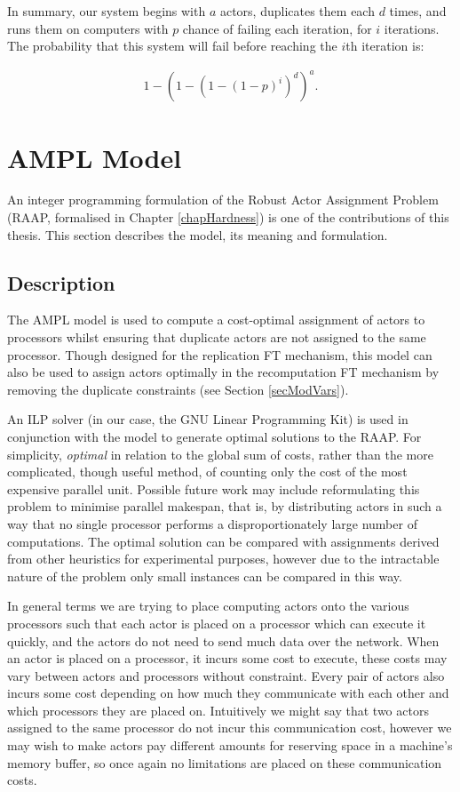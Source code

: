 In summary, our system begins with $a$ actors, duplicates them each $d$ times, and runs them on computers with $p$ chance of failing each iteration, for $i$ iterations.
The probability that this system will fail before reaching the $i$th iteration is:

\begin{align}
	\nonumber 1-(1-(1-(1-p)^i)^d)^a.
\end{align}

\section{AMPL Model}

An integer programming formulation of the Robust Actor Assignment Problem (RAAP, formalised in Chapter \ref{chapHardness}) is one of the contributions of this thesis.
This section describes the model, its meaning and formulation.

\subsection{Description}

The AMPL model is used to compute a cost-optimal assignment of actors to processors whilst ensuring that duplicate actors are not assigned to the same processor.
Though designed for the replication FT mechanism, this model can also be used to assign actors optimally in the recomputation FT mechanism by removing the duplicate constraints (see Section \ref{secModVars}).

An ILP solver (in our case, the GNU Linear Programming Kit) is used in conjunction with the model to generate optimal solutions to the RAAP.
For simplicity, {\em optimal} in relation to the global sum of costs, rather than the more complicated, though useful method, of counting only the cost of the most expensive parallel unit.
Possible future work may include reformulating this problem to minimise parallel makespan, that is, by distributing actors in such a way that no single processor performs a disproportionately large number of computations.
The optimal solution can be compared with assignments derived from other heuristics for experimental purposes, however due to the intractable nature of the problem only small instances can be compared in this way.

In general terms we are trying to place computing actors onto the various processors such that each actor is placed on a processor which can execute it quickly, and the actors do not need to send much data over the network.
When an actor is placed on a processor, it incurs some cost to execute, these costs may vary between actors and processors without constraint.
Every pair of actors also incurs some cost depending on how much they communicate with each other and which processors they are placed on.
Intuitively we might say that two actors assigned to the same processor do not incur this communication cost, however we may wish to make actors pay different amounts for reserving space in a machine's memory buffer, so once again no limitations are placed on these communication costs.

